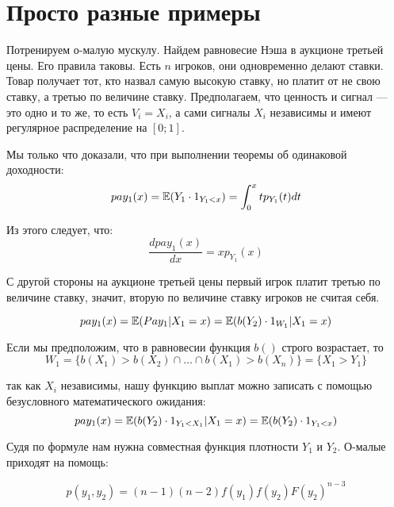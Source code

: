 \section{Просто разные примеры}


\begin{myex} Потренируем о-малую мускулу. Найдем равновесие Нэша в аукционе третьей цены. Его правила таковы. Есть $ n $ игроков, они одновременно делают ставки. Товар получает тот, кто назвал самую высокую ставку, но платит от не свою ставку, а третью по величине ставку. Предполагаем, что ценность и сигнал — это одно и то же, то есть $ V_{i}=X_{i} $, а сами сигналы $ X_{i} $ независимы и имеют регулярное распределение на $ [0;1] $.


Мы только что доказали, что при выполнении теоремы об одинаковой доходности:
\begin{equation}
pay_{1}(x)=\mathbb{E}(Y_{1}\cdot 1_{Y_{1}<x})=\int_{0}^{x}tp_{Y_{1}}(t)dt
\end{equation}

Из этого следует, что:
\begin{equation}
\frac{dpay_{1}(x)}{dx}=xp_{Y_{1}}(x)
\end{equation}


С другой стороны на аукционе третьей цены первый игрок платит третью по величине ставку, значит, вторую по величине ставку игроков не считая себя.

\begin{equation}
pay_{1}(x)=\mathbb{E}(Pay_{1}|X_{1}=x)=\mathbb{E}(b(Y_{2})\cdot 1_{W_{1}}|X_{1}=x)
\end{equation}

Если мы предположим, что в равновесии функция $ b() $ строго возрастает, то
\begin{equation}
W_{1}=\{b(X_{1})>b(X_{2})\cap \ldots\cap  b(X_{1})>b(X_{n})\}=\{X_{1}>Y_{1}\}
\end{equation}

так как $ X_{i} $ независимы, нашу функцию выплат можно записать с помощью безусловного математического ожидания:
\begin{equation}
pay_{1}(x)=\mathbb{E}(b(Y_{2})\cdot 1_{Y_{1}<X_{1}}|X_{1}=x)=\mathbb{E}(b(Y_{2})\cdot 1_{Y_{1}<x})
\end{equation}

Судя по формуле нам нужна совместная функция плотности $ Y_{1} $ и $ Y_{2} $. О-малые приходят на помощь:

\begin{equation}
p(y_{1},y_{2})=(n-1)(n-2)f(y_{1})f(y_{2})F(y_{2})^{n-3}
\end{equation}


\end{myex}
